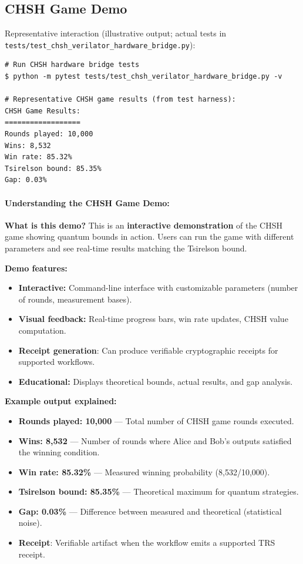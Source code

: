 \subsection{CHSH Game Demo}

Representative interaction (illustrative output; actual tests in \texttt{tests/test\_chsh\_verilator\_hardware\_bridge.py}):
\begin{lstlisting}
# Run CHSH hardware bridge tests
$ python -m pytest tests/test_chsh_verilator_hardware_bridge.py -v

# Representative CHSH game results (from test harness):
CHSH Game Results:
==================
Rounds played: 10,000
Wins: 8,532
Win rate: 85.32%
Tsirelson bound: 85.35%
Gap: 0.03%
\end{lstlisting}

\paragraph{Understanding the CHSH Game Demo:}

\textbf{What is this demo?} This is an \textbf{interactive demonstration} of the CHSH game showing quantum bounds in action. Users can run the game with different parameters and see real-time results matching the Tsirelson bound.

\textbf{Demo features:}
\begin{itemize}
    \item \textbf{Interactive:} Command-line interface with customizable parameters (number of rounds, measurement bases).
    \item \textbf{Visual feedback:} Real-time progress bars, win rate updates, CHSH value computation.
    \item \textbf{Receipt generation}: Can produce verifiable cryptographic receipts for supported workflows.
    \item \textbf{Educational:} Displays theoretical bounds, actual results, and gap analysis.
\end{itemize}

\textbf{Example output explained:}
\begin{itemize}
    \item \textbf{Rounds played: 10,000} — Total number of CHSH game rounds executed.
    \item \textbf{Wins: 8,532} — Number of rounds where Alice and Bob's outputs satisfied the winning condition.
    \item \textbf{Win rate: 85.32\%} — Measured winning probability (8,532/10,000).
    \item \textbf{Tsirelson bound: 85.35\%} — Theoretical maximum for quantum strategies.
    \item \textbf{Gap: 0.03\%} — Difference between measured and theoretical (statistical noise).
    \item \textbf{Receipt}: Verifiable artifact when the workflow emits a supported TRS receipt.
\end{itemize}



